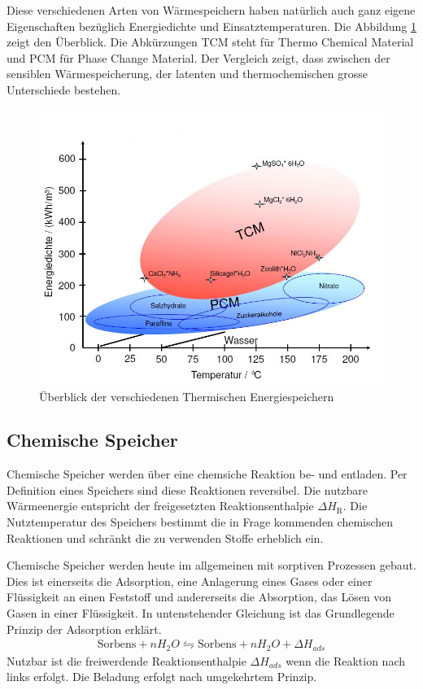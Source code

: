 \documentclass[11pt,a4paper]{scrartcl}
\begin{document}
Diese verschiedenen Arten von Wärmespeichern haben natürlich auch ganz eigene
Eigenschaften bezüglich Energiedichte und Einsatztemperaturen. Die Abbildung
\ref{fig:temperaturenergiedichte} zeigt den Überblick. Die Abkürzungen TCM steht
für Thermo Chemical Material und PCM für Phase Change Material. Der
Vergleich zeigt, dass zwischen der sensiblen Wärmespeicherung, der latenten
und thermochemischen grosse Unterschiede bestehen.

\begin{figure}[h]
\begin{center}
\includegraphics[scale=0.5]{images/temperaturenergiedichte.jpg}
\caption{Überblick der verschiedenen Thermischen Energiespeichern \cite{zaebayern}}
\label{fig:temperaturenergiedichte}
\end{center}
\end{figure}

\subsection{Chemische Speicher}
Chemische Speicher werden über eine chemsiche Reaktion be- und entladen. Per
Definition eines Speichers sind diese Reaktionen reversibel. Die nutzbare
Wärmeenergie entspricht der freigesetzten Reaktionsenthalpie $\Delta
H_{\mathrm{R}}$. Die Nutztemperatur des Speichers bestimmt die in Frage
kommenden chemischen Reaktionen und schränkt die zu verwenden Stoffe erheblich
ein.

Chemische Speicher werden heute im allgemeinen mit sorptiven Prozessen gebaut.
Dies ist einerseits die Adsorption, eine Anlagerung eines Gases oder einer
Flüssigkeit an einen Feststoff und andererseits die Absorption, das Lösen von
Gasen in einer Flüssigkeit. In untenstehender Gleichung ist das Grundlegende
Prinzip der Adsorption erklärt.
\begin{align}
\text{Sorbens}+nH_2O\leftrightharpoons \text{Sorbens}+nH_2O+\Delta H_{ads}
\end{align}
Nutzbar ist die freiwerdende Reaktionsenthalpie $\Delta H_{ads}$ wenn die
Reaktion nach links erfolgt. Die Beladung erfolgt nach umgekehrtem Prinzip.  
\cite{Wesselak}
\end{document}
